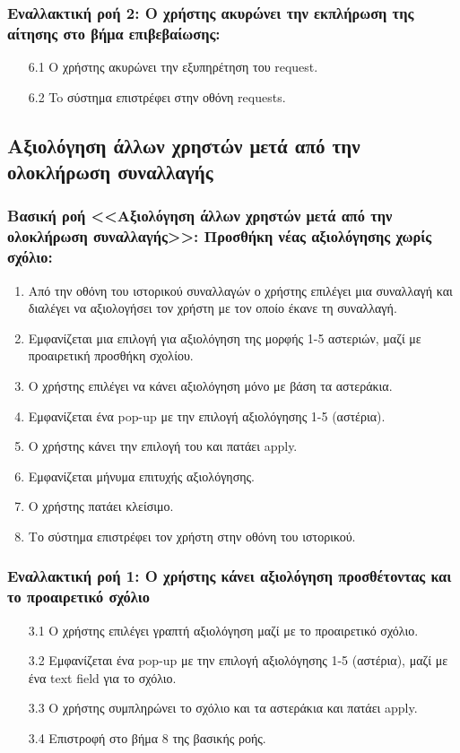 \documentclass[12pt,a4paper]{article}
\begin{document}
\subsubsection*{Εναλλακτική ροή 2: Ο χρήστης ακυρώνει την εκπλήρωση της αίτησης στο βήμα επιβεβαίωσης:}
\begin{enumerate}
    \item [6.1] Ο χρήστης ακυρώνει την εξυπηρέτηση του request.
    \item [6.2] To σύστημα επιστρέφει στην οθόνη requests.
\end{enumerate}

\subsection{Αξιολόγηση άλλων χρηστών μετά από την ολοκλήρωση συναλλαγής}

\subsubsection*{Βασική ροή <<Αξιολόγηση άλλων χρηστών μετά από την ολοκλήρωση συναλλαγής>>: Προσθήκη νέας αξιολόγησης χωρίς σχόλιο:}
\begin{enumerate}
    \item Από την οθόνη του ιστορικού συναλλαγών ο χρήστης επιλέγει μια συναλλαγή και διαλέγει να αξιολογήσει τον χρήστη με τον οποίο έκανε τη συναλλαγή.
    \item Εμφανίζεται μια επιλογή για αξιολόγηση της μορφής 1-5 αστεριών, μαζί με προαιρετική προσθήκη σχολίου.
    \item Ο χρήστης επιλέγει να κάνει αξιολόγηση μόνο με βάση τα αστεράκια.
    \item Εμφανίζεται ένα pop-up με την επιλογή αξιολόγησης 1-5 (αστέρια).
    \item Ο χρήστης κάνει την επιλογή του και πατάει apply.
    \item Εμφανίζεται μήνυμα επιτυχής αξιολόγησης.
    \item Ο χρήστης πατάει κλείσιμο.
    \item Το σύστημα επιστρέφει τον χρήστη στην οθόνη του ιστορικού.
\end{enumerate}

\subsubsection*{Εναλλακτική ροή 1: Ο χρήστης κάνει αξιολόγηση προσθέτοντας και το προαιρετικό σχόλιο}
\begin{enumerate}
    \item [3.1] Ο χρήστης επιλέγει γραπτή αξιολόγηση μαζί με το προαιρετικό σχόλιο.
    \item [3.2] Εμφανίζεται ένα pop-up με την επιλογή αξιολόγησης 1-5 (αστέρια), μαζί με ένα text field για το σχόλιο.
    \item [3.3] Ο χρήστης συμπληρώνει το σχόλιο και τα αστεράκια και πατάει apply.
    \item [3.4] Επιστροφή στο βήμα 8 της βασικής ροής.
\end{enumerate}
\end{document}
